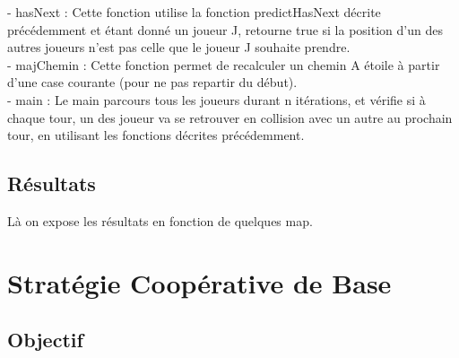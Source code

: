 \documentclass{article}
\begin{document}
- hasNext : Cette fonction utilise la fonction predictHasNext décrite précédemment et étant donné un joueur J, retourne true si la position d'un des autres joueurs n'est pas celle que le joueur J souhaite prendre. \\ 
	
- majChemin : Cette fonction permet de recalculer un chemin A étoile à partir d'une case courante (pour ne pas repartir du début). \\ 
	
- main : Le main parcours tous les joueurs durant n itérations, et vérifie si à chaque tour, un des joueur va se retrouver en collision avec un autre au prochain tour, en utilisant les fonctions décrites précédemment. \\ 
	
	\subsection{Résultats}
		Là on expose les résultats en fonction de quelques map.
	
	
\section{Stratégie Coopérative de Base}
	\subsection{Objectif}
	
\end{document}

